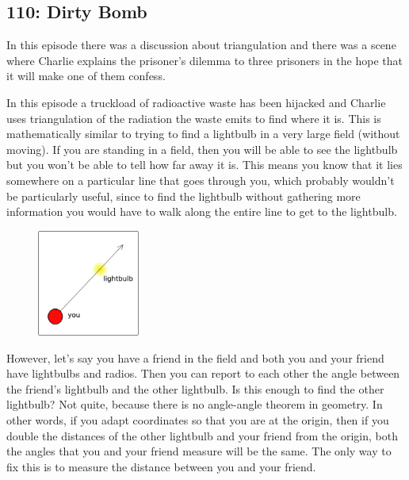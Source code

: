 \newpage
\subsection{110: Dirty Bomb\label{110}}

In this episode there was a discussion about triangulation and there was a scene where Charlie explains the prisoner's dilemma to three prisoners in the hope that it will make one of them confess. \\


In this episode a truckload of radioactive waste has been hijacked and Charlie uses triangulation of the radiation the waste emits to find where it is. This is mathematically similar to trying to find a lightbulb in a very large field (without moving). If you are standing in a field, then you will be able to see the lightbulb but you won't be able to tell how far away it is. This means you know that it lies somewhere on a particular line that goes through you, which probably wouldn't be particularly useful, since to find the lightbulb without gathering more information you would have to walk along the entire line to get to the lightbulb. \\

	\begin{figure}[H]
	   \centering
	   \includegraphics[width=0.30\textwidth]{season1/110/images/drawing1.png} 
	\end{figure}

However, let's say you have a friend in the field and both you and your friend have lightbulbs and radios. Then you can report to each other the angle between the friend's lightbulb and the other lightbulb. Is this enough to find the other lightbulb? Not quite, because there is no angle-angle theorem in geometry. In other words, if you adapt coordinates so that you are at the origin, then if you double the distances of the other lightbulb and your friend from the origin, both the angles that you and your friend measure will be the same. The only way to fix this is to measure the distance between you and your friend. \\

